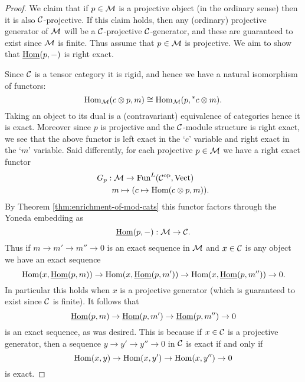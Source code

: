 \documentclass{amsart}
\begin{document}
\begin{proof}
	We claim that if $p \in \mathcal M$ is a projective object (in the ordinary sense) then it is also $\mathcal C$-projective. If this claim holds, then any (ordinary) projective generator of $\mathcal M$ will be a $\mathcal C$-projective $\mathcal C$-generator, and these are guaranteed to exist since $\mathcal M$ is finite. Thus assume that $p \in \mathcal M$ is projective.  We aim to show that $\operatorname{\underline{Hom}}(p, -)$ is right exact. 
	
	Since $\mathcal C$ is a tensor category it is rigid, and hence we have a natural isomorphism of functors:
\begin{equation*}
	\operatorname{Hom}_{\mathcal M}(c \otimes p, m) \cong \operatorname{Hom}_{\mathcal M}(p, {}^*c \otimes m).
\end{equation*}
Taking an object to its dual is a (contravariant) equivalence of categories hence it is exact. Moreover since $p$ is projective and the $\mathcal C$-module structure is right exact, we see that the above functor is left exact in the `$c$' variable and right exact in the `$m$' variable. Said differently, for each projective $p \in \mathcal M$ we have a right exact functor
\begin{align*}
	G_p: & \; \mathcal M \to \operatorname{Fun}^L(\mathcal C^{\mathrm{op}}, \mathrm{Vect}) \\
	& m \mapsto (c \mapsto \operatorname{Hom}(c \otimes p, m)).
\end{align*}
By Theorem \ref{thm:enrichment-of-mod-cats} this functor factors through the Yoneda embedding as
\begin{equation*}
	\operatorname{\underline{Hom}}(p, -): \mathcal M \to \mathcal C.
\end{equation*}
Thus if $m \to m' \to m'' \to 0$ is an exact sequence in $\mathcal M$ and $x \in \mathcal C$ is any object we have an exact sequence
\begin{equation*}
	\operatorname{Hom}(x, \operatorname{\underline{Hom}}(p,m)) \to \operatorname{Hom}(x, \operatorname{\underline{Hom}}(p,m')) \to \operatorname{Hom}(x, \operatorname{\underline{Hom}}(p,m'')) \to 0.
\end{equation*}
In particular this holds when $x$ is a projective generator (which is guaranteed to exist since $\mathcal C$ is finite). It follows that 
\begin{equation*}
	\operatorname{\underline{Hom}}(p,m) \to \operatorname{\underline{Hom}}(p,m') \to \operatorname{\underline{Hom}}(p,m'') \to 0
\end{equation*}
is an exact sequence, as was desired. This is because if $x \in \mathcal C$ is a projective generator, then a sequence $y \to y' \to y'' \to 0$ in $\mathcal C$ is exact if and only if 
\begin{equation*}
	\operatorname{Hom}(x, y) \to \operatorname{Hom}(x, y') \to \operatorname{Hom}(x, y'') \to 0
\end{equation*} 
is exact. 
\end{proof}
\end{document}
